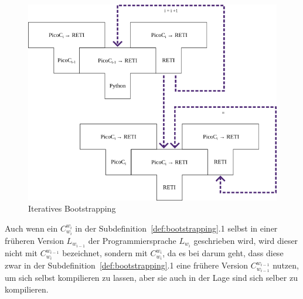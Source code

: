 \begin{figure}[H]
  \centering
  \includegraphics[width=0.66\linewidth]{./figures/bootstrapping.png}
  \caption{Iteratives Bootstrapping}
\end{figure}

\begin{Special_Paragraph}
  Auch wenn ein  $C_{w_i}^{w_i}$ in der Subdefinition~\ref{def:bootstrapping}{.1} selbst in einer früheren Version $L_{w_{i-1}}$ der Programmiersprache $L_{w_i}$ geschrieben wird, wird dieser nicht mit $C_{w_i}^{w_{i-1}}$ bezeichnet, sondern mit $C_{w_i}^{w_i}$, da es bei  darum geht, dass diese zwar in der Subdefinition~\ref{def:bootstrapping}{.1} eine frühere Version $C_{w_{i-1}}^{w_{i-1}}$ nutzen, um sich selbst kompilieren zu lassen, aber sie auch in der Lage sind sich selber zu kompilieren.
\end{Special_Paragraph}

